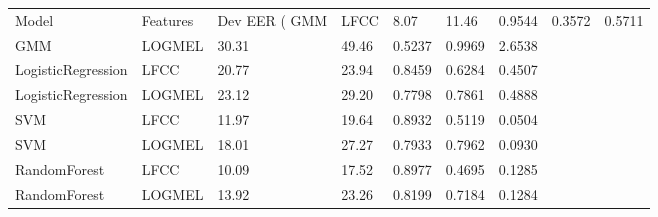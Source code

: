 \begin{tabular}{lllllll}
\toprule
Model & Features & Dev EER (%
\midrule
GMM & LFCC & 8.07 & 11.46 & 0.9544 & 0.3572 & 0.5711 \\
GMM & LOGMEL & 30.31 & 49.46 & 0.5237 & 0.9969 & 2.6538 \\
LogisticRegression & LFCC & 20.77 & 23.94 & 0.8459 & 0.6284 & 0.4507 \\
LogisticRegression & LOGMEL & 23.12 & 29.20 & 0.7798 & 0.7861 & 0.4888 \\
SVM & LFCC & 11.97 & 19.64 & 0.8932 & 0.5119 & 0.0504 \\
SVM & LOGMEL & 18.01 & 27.27 & 0.7933 & 0.7962 & 0.0930 \\
RandomForest & LFCC & 10.09 & 17.52 & 0.8977 & 0.4695 & 0.1285 \\
RandomForest & LOGMEL & 13.92 & 23.26 & 0.8199 & 0.7184 & 0.1284 \\
\bottomrule
\end{tabular}
